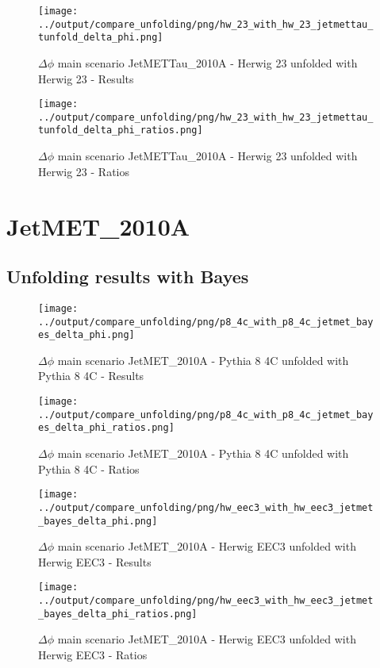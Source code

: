 \documentclass[11pt]{book}
\begin{document}
\begin{figure}[ht]
\centering
\texttt{[image: ../output/compare\_unfolding/png/hw\_23\_with\_hw\_23\_jetmettau\_tunfold\_delta\_phi.png]}
\caption{$\Delta\phi$ main scenario JetMETTau\_2010A - Herwig 23 unfolded with Herwig 23 - Results}
\label{hw_23_hw_23_jetmettau_tunfold_delta_phi_a}
\end{figure}

\begin{figure}[ht]
\centering
\texttt{[image: ../output/compare\_unfolding/png/hw\_23\_with\_hw\_23\_jetmettau\_tunfold\_delta\_phi\_ratios.png]}
\caption{$\Delta\phi$ main scenario JetMETTau\_2010A - Herwig 23 unfolded with Herwig 23 - Ratios}
\label{hw_23_jetmettau_tunfold_delta_phi_b}
\end{figure}

\clearpage
\section{JetMET\_2010A}
\subsection{Unfolding results with Bayes}

\begin{figure}[ht]
\centering
\texttt{[image: ../output/compare\_unfolding/png/p8\_4c\_with\_p8\_4c\_jetmet\_bayes\_delta\_phi.png]}
\caption{$\Delta\phi$ main scenario JetMET\_2010A - Pythia 8 4C unfolded with Pythia 8 4C - Results}
\label{p8_p8_jetmet_delta_phi_a}
\end{figure}

\begin{figure}[ht]
\centering
\texttt{[image: ../output/compare\_unfolding/png/p8\_4c\_with\_p8\_4c\_jetmet\_bayes\_delta\_phi\_ratios.png]}
\caption{$\Delta\phi$ main scenario JetMET\_2010A - Pythia 8 4C unfolded with Pythia 8 4C - Ratios}
\label{p8_p8_jetmet_delta_phi_b}
\end{figure}

\begin{figure}[ht]
\centering
\texttt{[image: ../output/compare\_unfolding/png/hw\_eec3\_with\_hw\_eec3\_jetmet\_bayes\_delta\_phi.png]}
\caption{$\Delta\phi$ main scenario JetMET\_2010A - Herwig EEC3 unfolded with Herwig EEC3 - Results}
\label{hw_eec3_hw_eec3_jetmet_delta_phi_a}
\end{figure}

\begin{figure}[ht]
\centering
\texttt{[image: ../output/compare\_unfolding/png/hw\_eec3\_with\_hw\_eec3\_jetmet\_bayes\_delta\_phi\_ratios.png]}
\caption{$\Delta\phi$ main scenario JetMET\_2010A - Herwig EEC3 unfolded with Herwig EEC3 - Ratios}
\label{hw_eec3_jetmet_delta_phi_b}
\end{figure}
\end{document}
